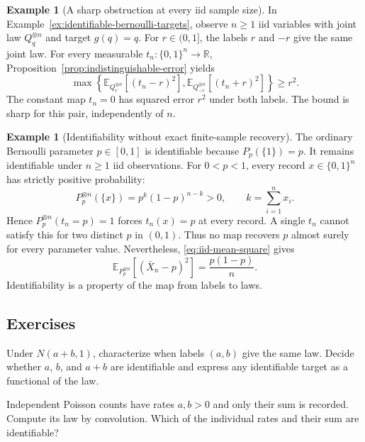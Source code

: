 \documentclass[11pt,oneside]{book}
\theoremstyle{definition}
\newtheorem{example}[theorem]{Example}
\theoremstyle{remark}
\newcommand{\R}{\mathbb R}
\begin{document}
\begin{example}[A sharp obstruction at every iid sample size]
\label{ex:signed-bernoulli-error}
In Example~\ref{ex:identifiable-bernoulli-targets}, observe
$n\geq1$ iid variables with joint law $Q_q^{\otimes n}$ and target $g(q)=q$.
For $r\in(0,1]$, the labels $r$ and $-r$ give the same joint law.
For every measurable $t_n:\{0,1\}^n\to\R$,
Proposition~\ref{prop:indistinguishable-error} yields
\[
\max\left\{
\mathbb E_{Q_r^{\otimes n}}\!\left[(t_n-r)^2\right],
\mathbb E_{Q_{-r}^{\otimes n}}\!\left[(t_n+r)^2\right]
\right\}\geq r^2.
\]
The constant map $t_n=0$ has squared error $r^2$ under both labels.
The bound is sharp for this pair, independently of $n$.
\end{example}

\begin{example}[Identifiability without exact finite-sample recovery]
\label{ex:bernoulli-no-exact-recovery}
The ordinary Bernoulli parameter $p\in[0,1]$ is identifiable because
$P_p(\{1\})=p$. It remains identifiable under $n\geq1$ iid observations.
For $0<p<1$, every record $x\in\{0,1\}^n$ has strictly positive probability:
\[
P_p^{\otimes n}(\{x\})=p^k(1-p)^{n-k}>0,
\qquad k=\sum_{i=1}^n x_i.
\]
Hence $P_p^{\otimes n}(t_n=p)=1$ forces $t_n(x)=p$ at every record.
A single $t_n$ cannot satisfy this for two distinct $p$ in $(0,1)$.
Thus no map recovers $p$ almost surely for every parameter value.
Nevertheless, \eqref{eq:iid-mean-square} gives
\[
\mathbb E_{P_p^{\otimes n}}\!\left[(\bar X_n-p)^2\right]
=\frac{p(1-p)}n.
\]
Identifiability is a property of the map from labels to laws.
\end{example}

\subsection{Exercises}
\label{subsec:worked-examples-1-3}

\begin{practiceexercise}
\label{wex:additive-mean-target}
Under $N(a+b,1)$, characterize when labels $(a,b)$ give the same law. Decide
whether $a$, $b$, and $a+b$ are identifiable and express any identifiable
target as a functional of the law.
\end{practiceexercise}

\begin{practiceexercise}
\label{wex:poisson-total-identification}
Independent Poisson counts have rates $a,b>0$ and only their sum is
recorded. Compute its law by convolution. Which of the individual rates and
their sum are identifiable?
\end{practiceexercise}
\end{document}
